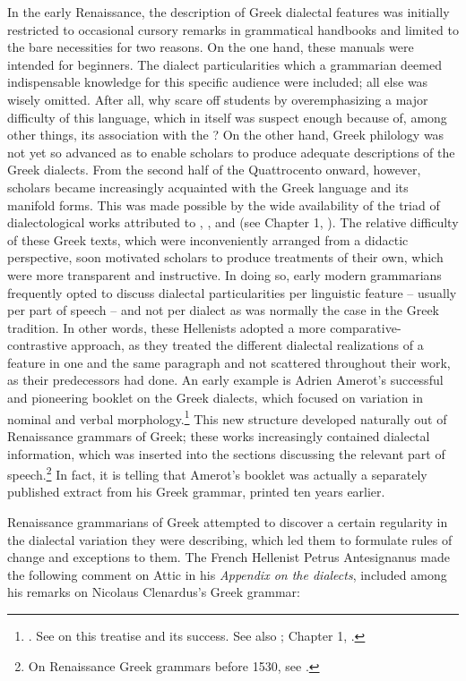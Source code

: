 In the early Renaissance, the description of Greek dialectal features was initially restricted to occasional cursory remarks in grammatical handbooks and limited to the bare necessities for two reasons. On the one hand, these manuals were intended for beginners. The dialect particularities which a grammarian deemed indispensable knowledge for this specific audience were included; all else was wisely omitted. After all, why scare off students by overemphasizing a major difficulty of this language, which in itself was suspect enough because of, among other things, its association with the ? On the other hand, Greek philology was not yet so advanced as to enable scholars to produce adequate descriptions of the Greek dialects. From the second half of the Quattrocento onward, however, scholars became increasingly acquainted with the Greek language and its manifold forms. This was made possible by the wide availability of the triad of dialectological works attributed to , , and  (see Chapter 1, ). The relative difficulty of these Greek texts, which were inconveniently arranged from a didactic perspective, soon motivated scholars to produce treatments of their own, which were more transparent and instructive. In doing so, early modern grammarians frequently opted to discuss dialectal particularities per linguistic feature – usually per part of speech – and not per dialect as was normally the case in the Greek tradition. In other words, these Hellenists adopted a more comparative-contrastive approach, as they treated the different dialectal realizations of a feature in one and the same paragraph and not scattered throughout their work, as their predecessors had done. An early example is Adrien Amerot’s successful and pioneering booklet on the Greek dialects, which focused on variation in nominal and verbal morphology.\footnote{{\citet{Amerot1530}. See \citet[1--19]{Hoven1985} on this treatise and its success. See also \citet{Hummel1999}; Chapter 1, .}} This new structure developed naturally out of Renaissance grammars of Greek; these works increasingly contained dialectal information, which was inserted into the sections discussing the relevant part of speech.\footnote{{On Renaissance Greek grammars before 1530, see \citet{Botley2010}.}} In fact, it is telling that Amerot’s booklet was actually a separately published extract from his Greek grammar, printed ten years earlier.

Renaissance grammarians of Greek attempted to discover a certain regularity in the dialectal variation they were describing, which led them to formulate rules of change and exceptions to them. The French Hellenist Petrus Antesignanus made the following comment on Attic in his \textit{Appendix on the dialects}, included among his remarks on Nicolaus Clenardus’s Greek grammar:

